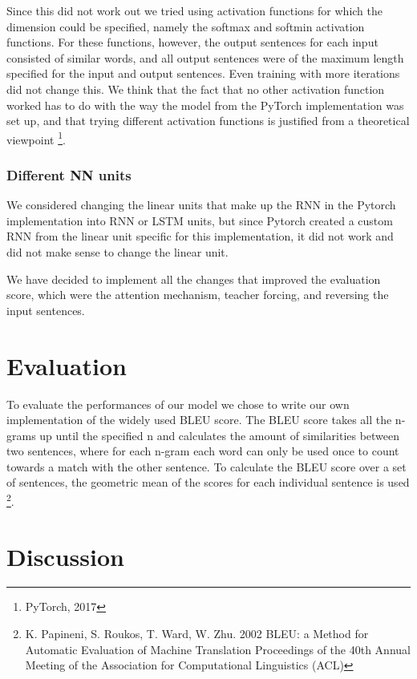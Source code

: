 \documentclass[11pt]{article}
\begin{document}
Since this did not work out we tried using activation functions for which the dimension could be specified, namely the softmax and softmin activation functions. For these functions, however, the output sentences for each input consisted of similar words, and all output sentences were of the maximum length specified for the input and output sentences. Even training with more iterations did not change this. We think that the fact that no other activation function worked has to do with the way the model from the PyTorch implementation was set up, and that trying different activation functions is justified from a theoretical viewpoint \footnote[11]{PyTorch, 2017}.

\subsubsection*{Different NN units}
We considered changing the linear units that make up the RNN in the Pytorch implementation into RNN or LSTM units, but since Pytorch created a custom RNN from the linear unit specific for this implementation, it did not work and did not make sense to change the linear unit.

We have decided to implement all the changes that improved the evaluation score, which were the attention mechanism, teacher forcing, and reversing the input sentences.

\section{Evaluation}
To evaluate the performances of our model we chose to write our own implementation of the widely used BLEU score. The BLEU score takes all the n-grams up until the specified n and calculates the amount of similarities between two sentences, where for each n-gram each word can only be used once to count towards a match with the other sentence. To calculate the BLEU score over a set of sentences, the geometric mean of the scores for each individual sentence is used \footnote[12]{K. Papineni, S. Roukos, T. Ward, W. Zhu. 2002 BLEU: a Method for Automatic Evaluation of Machine Translation Proceedings of the 40th Annual Meeting of the Association for Computational Linguistics (ACL)}.

\section{Discussion}
\end{document}
